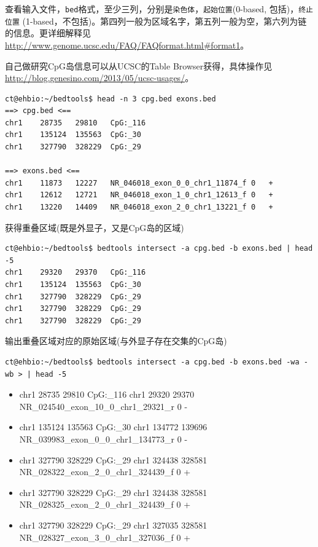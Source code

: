 \documentclass[]{article}
\providecommand{\tightlist}{%
  \setlength{\itemsep}{0pt}\setlength{\parskip}{0pt}}
\numberwithin{figure}{section}
\numberwithin{table}{section}
\begin{document}
查看输入文件，\texttt{bed}格式，至少三列，分别是\texttt{染色体}，\texttt{起始位置}(0-based, 包括)，\texttt{终止位置} (1-based，不包括)。第四列一般为区域名字，第五列一般为空，第六列为链的信息。更详细解释见\url{http://www.genome.ucsc.edu/FAQ/FAQformat.html\#format1}。

自己做研究CpG岛信息可以从UCSC的Table Browser获得，具体操作见\url{http://blog.genesino.com/2013/05/ucsc-usages/}。

\begin{verbatim}
ct@ehbio:~/bedtools$ head -n 3 cpg.bed exons.bed
==> cpg.bed <==
chr1	28735	29810	CpG:_116
chr1	135124	135563	CpG:_30
chr1	327790	328229	CpG:_29

==> exons.bed <==
chr1	11873	12227	NR_046018_exon_0_0_chr1_11874_f	0	+
chr1	12612	12721	NR_046018_exon_1_0_chr1_12613_f	0	+
chr1	13220	14409	NR_046018_exon_2_0_chr1_13221_f	0	+
\end{verbatim}

获得重叠区域(既是外显子，又是CpG岛的区域)

\begin{verbatim}
ct@ehbio:~/bedtools$ bedtools intersect -a cpg.bed -b exons.bed | head -5
chr1	29320	29370	CpG:_116
chr1	135124	135563	CpG:_30
chr1	327790	328229	CpG:_29
chr1	327790	328229	CpG:_29
chr1	327790	328229	CpG:_29
\end{verbatim}

输出重叠区域对应的原始区域(与外显子存在交集的CpG岛)

\begin{verbatim}
ct@ehbio:~/bedtools$ bedtools intersect -a cpg.bed -b exons.bed -wa -wb > | head -5
\end{verbatim}

\begin{itemize}
\tightlist
\item
  chr1 28735 29810 CpG:\_116 chr1 29320 29370 NR\_024540\_exon\_10\_0\_chr1\_29321\_r 0 -
\item
  chr1 135124 135563 CpG:\_30 chr1 134772 139696 NR\_039983\_exon\_0\_0\_chr1\_134773\_r 0 -
\item
  chr1 327790 328229 CpG:\_29 chr1 324438 328581 NR\_028322\_exon\_2\_0\_chr1\_324439\_f 0 +
\item
  chr1 327790 328229 CpG:\_29 chr1 324438 328581 NR\_028325\_exon\_2\_0\_chr1\_324439\_f 0 +
\item
  chr1 327790 328229 CpG:\_29 chr1 327035 328581 NR\_028327\_exon\_3\_0\_chr1\_327036\_f 0 +
\end{itemize}
\end{document}
